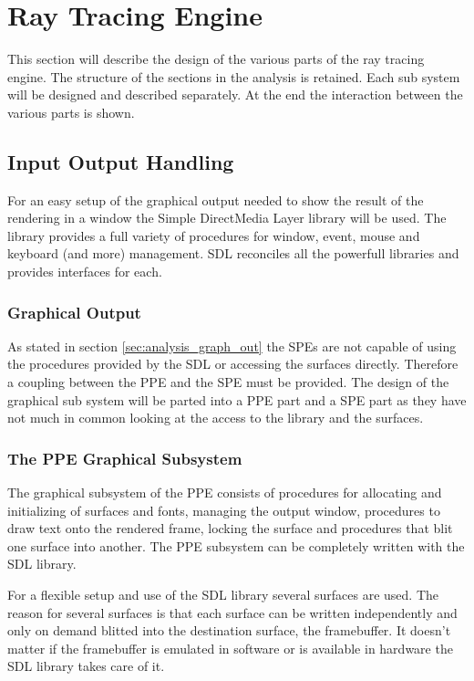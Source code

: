 \documentclass[DIV10, abstracton, openright, footsepline, headsepline, twoside, 9pt,
bigheadings]{scrreprt}
\begin{document}
\section{Ray Tracing Engine}
\label{sec:rt_design}
\label{sec:design_rt}
This section will describe the design of the various parts of the ray tracing
engine. The structure of the sections in the analysis is retained. Each
sub system will be designed and described separately. At the end the interaction
between the various parts is shown.


\subsection{Input Output Handling}
For an easy setup of the graphical output needed to show the result of
the rendering in a window the Simple DirectMedia Layer library will be used.
The library provides a full variety of procedures for window, event, mouse
and keyboard (and more) management.  SDL reconciles all the powerfull libraries
and provides interfaces for each.


\subsubsection{Graphical Output}
\label{sec:design_graph_out}
As stated in section \ref{sec:analysis_graph_out} the SPEs are not capable of
using the procedures provided by the SDL or accessing the surfaces directly.
Therefore a coupling between the PPE and the SPE must be provided. The design of
the graphical sub system will be parted into a PPE part and a SPE part as they
have not much in common looking at the access to the library and the surfaces.

\subsubsection*{The PPE Graphical Subsystem}
The graphical subsystem of the PPE consists of procedures for allocating and
initializing of surfaces and fonts, managing the output window, procedures to
 draw text onto the rendered frame, locking the surface and procedures that blit
one surface into another. The PPE subsystem can be completely written with the
SDL library.

For a flexible setup and use of the SDL library several surfaces are used.
The reason for several surfaces is that each surface can be written independently
and only on demand blitted into the destination surface, the framebuffer. It
doesn't matter if the framebuffer is emulated in software or is available in
hardware the SDL library takes care of it.
\end{document}
